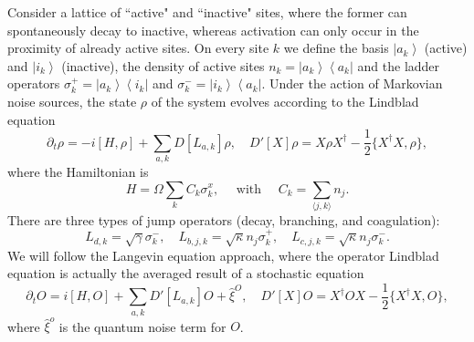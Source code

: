 \documentclass{SciPost}
\begin{document}
Consider a lattice of ``active" and ``inactive" sites, where the former can spontaneously decay to inactive, whereas activation can only occur in the proximity of already active sites. 
On every site $k$ we define the basis $\left|a_k\right\rangle$ (active) and $\left|i_k\right\rangle$ (inactive), the density of active sites $n_k=\left|a_k\right\rangle\left\langle a_k\right|$ and the ladder operators $\sigma_k^{+}=\left|a_k\right\rangle\left\langle i_k\right|$ and $\sigma_k^{-}=\left|i_k\right\rangle\left\langle a_k\right|$. 
Under the action of Markovian noise sources, the state $\rho$ of the system evolves according to the Lindblad equation 
\begin{equation}
	\partial_t \rho=-i[H, \rho]+\sum_{a, k} D\left[L_{a, k}\right] \rho,\quad
	D'[X]\rho = X \rho X^\dagger - \frac{1}{2}\{X^\dagger X, \rho\},
\end{equation}
where the Hamiltonian is 
\begin{equation}
	H=\Omega \sum_k C_k \sigma_k^x, \quad \text { with } \quad C_k=\sum_{\langle j,k\rangle} n_j.
\end{equation}
There are three types of jump operators (decay, branching, and coagulation):
\begin{equation}
	L_{d, k}=\sqrt{\gamma} \sigma_k^{-},\quad
	L_{b, j, k}=\sqrt{\kappa} n_j \sigma_k^{+},\quad
	L_{c, j, k}=\sqrt{\kappa} n_j \sigma_k^{-}.
\end{equation}
We will follow the Langevin equation approach, where the operator Lindblad equation is actually the averaged result of a stochastic equation
\begin{equation}
	\partial_t O = i[H, O]+\sum_{a, k} D'\left[L_{a, k}\right] O + \hat\xi^O,\quad
	D'[X]O = X^\dagger O X - \frac{1}{2}\{X^\dagger X, O\},
\end{equation}
where $\hat\xi^o$ is the quantum noise term for $O$.
\end{document}
